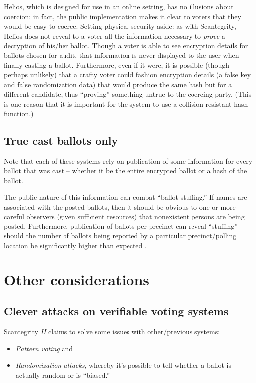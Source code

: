 \documentclass[10pt]{article}
\newcommand{\term}[1]{\textit{#1}}
\begin{document}
\begin{multicols}{2}
Helios, which is designed for use in an online setting, has no illusions about coercion: in fact,
the public implementation makes it clear to voters that they would be easy to coerce. Setting
physical security aside: as with Scantegrity, Helios does not reveal to a voter all the
information necessary to \emph{prove} a decryption of his/her ballot. Though a voter is able to see
encryption details for ballots chosen for audit, that information is never displayed to the user
when finally casting a ballot. Furthermore, even if it were, it is possible (though perhaps
unlikely) that a crafty voter could fashion encryption details (a false key and false randomization
data) that would produce the same hash but for a different candidate, thus ``proving'' something
untrue to the coercing party. (This is one reason that it is important for the system to use a
collision-resistant hash function.)

\subsection{True cast ballots only}

Note that each of these systems rely on publication of some information for every ballot that was
cast -- whether it be the entire encrypted ballot or a hash of the ballot.

The public nature of this information can combat ``ballot stuffing.'' If names are associated with
the posted ballots, then it should be obvious to one or more careful observers (given sufficient
resources) that nonexistent persons are being posted. Furthermore, publication of ballots
per-precinct can reveal ``stuffing'' should the number of ballots being reported by a particular
precinct/polling location be significantly higher than expected \cite{helios}.

\section{Other considerations}

\subsection{Clever attacks on verifiable voting systems}

Scantegrity \emph{II} claims to solve some issues with other/previous systems:
\begin{itemize}
	\item
		\term{Pattern voting} and
	\item
		\term{Randomization attacks}, whereby it's possible to tell whether a ballot is actually random
		or is ``biased.''
\end{itemize}


\end{multicols}
\end{document}
